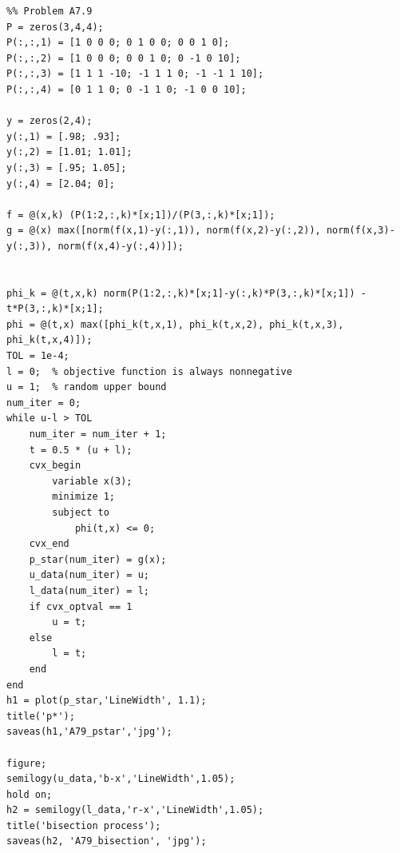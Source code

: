 \documentclass[12pt,a4paper]{article}
\begin{document}
\begin{verbatim}
%% Problem A7.9
P = zeros(3,4,4);
P(:,:,1) = [1 0 0 0; 0 1 0 0; 0 0 1 0];
P(:,:,2) = [1 0 0 0; 0 0 1 0; 0 -1 0 10];
P(:,:,3) = [1 1 1 -10; -1 1 1 0; -1 -1 1 10];
P(:,:,4) = [0 1 1 0; 0 -1 1 0; -1 0 0 10];

y = zeros(2,4);
y(:,1) = [.98; .93];
y(:,2) = [1.01; 1.01];
y(:,3) = [.95; 1.05];
y(:,4) = [2.04; 0];

f = @(x,k) (P(1:2,:,k)*[x;1])/(P(3,:,k)*[x;1]);
g = @(x) max([norm(f(x,1)-y(:,1)), norm(f(x,2)-y(:,2)), norm(f(x,3)-y(:,3)), norm(f(x,4)-y(:,4))]);


phi_k = @(t,x,k) norm(P(1:2,:,k)*[x;1]-y(:,k)*P(3,:,k)*[x;1]) - t*P(3,:,k)*[x;1];
phi = @(t,x) max([phi_k(t,x,1), phi_k(t,x,2), phi_k(t,x,3), phi_k(t,x,4)]);
TOL = 1e-4;
l = 0;  % objective function is always nonnegative
u = 1;  % random upper bound
num_iter = 0;
while u-l > TOL
    num_iter = num_iter + 1;
    t = 0.5 * (u + l);
    cvx_begin
        variable x(3);
        minimize 1;
        subject to
            phi(t,x) <= 0;
    cvx_end
    p_star(num_iter) = g(x);
    u_data(num_iter) = u;
    l_data(num_iter) = l;
    if cvx_optval == 1
        u = t;
    else
        l = t;
    end
end
h1 = plot(p_star,'LineWidth', 1.1);
title('p*');
saveas(h1,'A79_pstar','jpg');

figure;
semilogy(u_data,'b-x','LineWidth',1.05);
hold on;
h2 = semilogy(l_data,'r-x','LineWidth',1.05);
title('bisection process');
saveas(h2, 'A79_bisection', 'jpg');
\end{verbatim}
\end{document}
